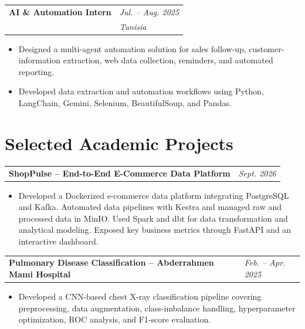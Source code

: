 \documentclass[10pt,letterpaper]{article}
\makeatletter
\newcommand{\resumeEntry}[4]{%
    \begin{tabularx}{\textwidth}
    {@{}>{\RaggedRight\arraybackslash}X
    >{\RaggedLeft\arraybackslash}p{1.65in}@{}}

        \textbf{#1}
        &
        {\small\textit{#2}}
        \\[-1pt]

        {\small\textit{\color{secondary}#3}}
        &
        {\small\textit{\color{secondary}#4}}

    \end{tabularx}
}
\newcommand{\projectEntry}[2]{%
    \begin{tabularx}{\textwidth}
    {@{}>{\RaggedRight\arraybackslash}X
    >{\RaggedLeft\arraybackslash}p{1.65in}@{}}

        \textbf{#1}
        &
        {\small\textit{#2}}

    \end{tabularx}
}
\makeatother
\begin{document}
\vspace{1pt}

\resumeEntry
{AI \& Automation Intern}
{Jul. -- Aug. 2025}
{SFM Technologie}
{Tunisia}
\vspace{-7pt}

\begin{itemize}

    \item Designed a multi-agent automation solution for sales follow-up,
    customer-information extraction, web data collection, reminders, and
    automated reporting.

    \item Developed data extraction and automation workflows using Python,
    LangChain, Gemini, Selenium, BeautifulSoup, and Pandas.

\end{itemize}


\section{Selected Academic Projects}

\projectEntry
{ShopPulse -- End-to-End E-Commerce Data Platform}
{Sept. 2026}
\vspace{-11pt}

\begin{itemize}
    \item Developed a Dockerized e-commerce data platform integrating PostgreSQL and Kafka.
    Automated data pipelines with Kestra and managed raw and processed data in MinIO.
    Used Spark and dbt for data transformation and analytical modeling.
    Exposed key business metrics through FastAPI and an interactive dashboard.
\end{itemize}

\vspace{1pt}


\projectEntry
{Pulmonary Disease Classification -- Abderrahmen Mami Hospital}
{Feb. -- Apr. 2025}
\vspace{-11pt}

\begin{itemize}
    \item Developed a CNN-based chest X-ray classification pipeline covering
    preprocessing, data augmentation, class-imbalance handling,
    hyperparameter optimization, ROC analysis, and F1-score evaluation.
\end{itemize}
\end{document}
